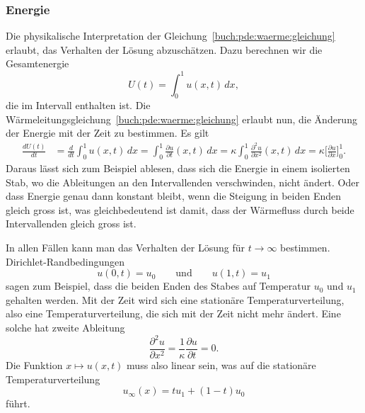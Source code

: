\subsubsection{Energie}
Die physikalische Interpretation der
Gleichung~\ref{buch:pde:waerme:gleichung}
erlaubt, das Verhalten der Lösung abzuschätzen.
Dazu berechnen wir die Gesamtenergie
\[
U(t) = \int_0^1 u(x,t)\,dx,
\]
die im Intervall enthalten ist.
Die Wärmeleitungsgleichung~\ref{buch:pde:waerme:gleichung} erlaubt nun,
die Änderung der Energie mit der Zeit zu bestimmen.
Es gilt
\begin{align*}
\frac{dU(t)}{dt}
&=
\frac{d}{dt} \int_0^1 u(x,t)\,dx
=
\int_0^1 \frac{\partial u}{\partial t} (x,t)\,dx
=
\kappa \int_0^1 \frac{\partial^2u}{\partial x^2}(x,t)\,dx
=
\kappa \biggl[\frac{\partial u}{\partial x}\biggr]_0^1.
\end{align*}
Daraus lässt sich zum Beispiel ablesen, dass sich die Energie in
einem isolierten Stab, wo die Ableitungen an den Intervallenden
verschwinden, nicht ändert.
Oder dass Energie genau dann konstant bleibt, wenn die Steigung
in beiden Enden gleich gross ist, was gleichbedeutend ist damit,
dass der Wärmefluss durch beide Intervallenden gleich gross ist.

In allen Fällen kann man das Verhalten der Lösung für $t\to\infty$
bestimmen.
Dirichlet-Randbedingungen 
\[
u(0,t) = u_0 \qquad\text{und}\qquad u(1,t) = u_1
\]
sagen zum Beispiel, dass die beiden Enden des Stabes auf Temperatur
$u_0$ und $u_1$ gehalten werden.
Mit der Zeit wird sich eine stationäre Temperaturverteilung, also eine
Temperaturverteilung, die sich mit der Zeit nicht mehr ändert.
Eine solche hat zweite Ableitung
\[
\frac{\partial^2u}{\partial x^2}
=
\frac{1}{\kappa} \frac{\partial u}{\partial t} = 0.
\]
Die Funktion $x\mapsto u(x,t)$ muss also linear sein, was auf die
stationäre Temperaturverteilung
\[
u_\infty(x) = tu_1 + (1-t)u_0
\]
führt.

